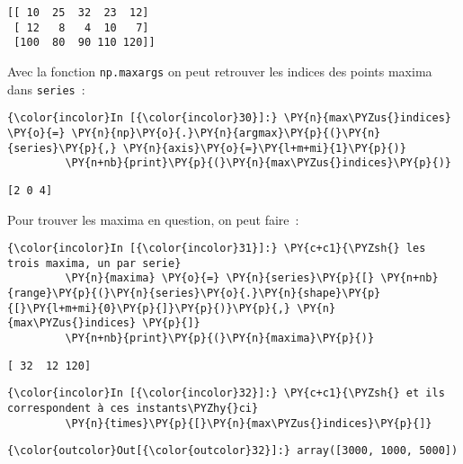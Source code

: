     \begin{Verbatim}[commandchars=\\\{\}]
[[ 10  25  32  23  12]
 [ 12   8   4  10   7]
 [100  80  90 110 120]]

    \end{Verbatim}

    Avec la fonction \texttt{np.maxargs} on peut retrouver les indices des
points maxima dans \texttt{series}~:

    \begin{Verbatim}[commandchars=\\\{\}]
{\color{incolor}In [{\color{incolor}30}]:} \PY{n}{max\PYZus{}indices} \PY{o}{=} \PY{n}{np}\PY{o}{.}\PY{n}{argmax}\PY{p}{(}\PY{n}{series}\PY{p}{,} \PY{n}{axis}\PY{o}{=}\PY{l+m+mi}{1}\PY{p}{)}
         \PY{n+nb}{print}\PY{p}{(}\PY{n}{max\PYZus{}indices}\PY{p}{)}
\end{Verbatim}


    \begin{Verbatim}[commandchars=\\\{\}]
[2 0 4]

    \end{Verbatim}

    Pour trouver les maxima en question, on peut faire~:

    \begin{Verbatim}[commandchars=\\\{\}]
{\color{incolor}In [{\color{incolor}31}]:} \PY{c+c1}{\PYZsh{} les trois maxima, un par serie}
         \PY{n}{maxima} \PY{o}{=} \PY{n}{series}\PY{p}{[} \PY{n+nb}{range}\PY{p}{(}\PY{n}{series}\PY{o}{.}\PY{n}{shape}\PY{p}{[}\PY{l+m+mi}{0}\PY{p}{]}\PY{p}{)}\PY{p}{,} \PY{n}{max\PYZus{}indices} \PY{p}{]}
         \PY{n+nb}{print}\PY{p}{(}\PY{n}{maxima}\PY{p}{)}
\end{Verbatim}


    \begin{Verbatim}[commandchars=\\\{\}]
[ 32  12 120]

    \end{Verbatim}

    \begin{Verbatim}[commandchars=\\\{\}]
{\color{incolor}In [{\color{incolor}32}]:} \PY{c+c1}{\PYZsh{} et ils correspondent à ces instants\PYZhy{}ci}
         \PY{n}{times}\PY{p}{[}\PY{n}{max\PYZus{}indices}\PY{p}{]}
\end{Verbatim}


\begin{Verbatim}[commandchars=\\\{\}]
{\color{outcolor}Out[{\color{outcolor}32}]:} array([3000, 1000, 5000])
\end{Verbatim}
            
